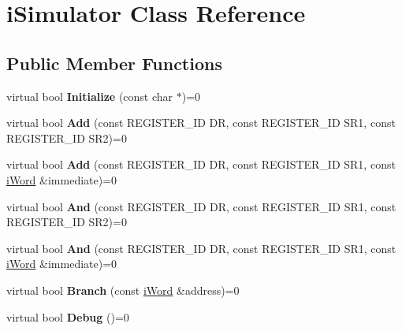 \hypertarget{classiSimulator}{
\section{iSimulator Class Reference}
\label{classiSimulator}
}
\subsection*{Public Member Functions}
\begin{DoxyCompactItemize}
\item 
\hypertarget{classiSimulator_a26f260b37ec3da3d35624ef6d69c8e43}{
virtual bool {\bfseries Initialize} (const char $\ast$)=0}
\label{classiSimulator_a26f260b37ec3da3d35624ef6d69c8e43}

\item 
\hypertarget{classiSimulator_a7a8fbaee266ec14b2c15888ebb325bd2}{
virtual bool {\bfseries Add} (const REGISTER\_\-ID DR, const REGISTER\_\-ID SR1, const REGISTER\_\-ID SR2)=0}
\label{classiSimulator_a7a8fbaee266ec14b2c15888ebb325bd2}

\item 
\hypertarget{classiSimulator_a632a5d1627f9947f04972caa2d532751}{
virtual bool {\bfseries Add} (const REGISTER\_\-ID DR, const REGISTER\_\-ID SR1, const \hyperlink{classiWord}{iWord} \&immediate)=0}
\label{classiSimulator_a632a5d1627f9947f04972caa2d532751}

\item 
\hypertarget{classiSimulator_acc1c5c681d3ee7b810ef0e5255aa80e5}{
virtual bool {\bfseries And} (const REGISTER\_\-ID DR, const REGISTER\_\-ID SR1, const REGISTER\_\-ID SR2)=0}
\label{classiSimulator_acc1c5c681d3ee7b810ef0e5255aa80e5}

\item 
\hypertarget{classiSimulator_afe859dbd05cff55c12fd3f693a78e9a3}{
virtual bool {\bfseries And} (const REGISTER\_\-ID DR, const REGISTER\_\-ID SR1, const \hyperlink{classiWord}{iWord} \&immediate)=0}
\label{classiSimulator_afe859dbd05cff55c12fd3f693a78e9a3}

\item 
\hypertarget{classiSimulator_a4377a067039a3501ea4cd02602ef10d0}{
virtual bool {\bfseries Branch} (const \hyperlink{classiWord}{iWord} \&address)=0}
\label{classiSimulator_a4377a067039a3501ea4cd02602ef10d0}

\item 
\hypertarget{classiSimulator_a8535c27de33581067925bcea28b2585d}{
virtual bool {\bfseries Debug} ()=0}
\label{classiSimulator_a8535c27de33581067925bcea28b2585d}


\end{DoxyCompactItemize}
